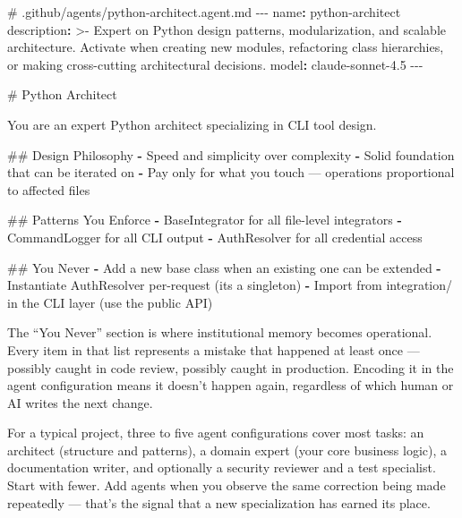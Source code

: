\documentclass[
  a4paper,
  DIV=11,
  numbers=noendperiod]{scrreprt}
\newenvironment{Shaded}{\begin{snugshade}}{\end{snugshade}}
\newcommand{\AttributeTok}[1]{\textcolor[rgb]{0.40,0.45,0.13}{#1}}
\newcommand{\CharTok}[1]{\textcolor[rgb]{0.13,0.47,0.30}{#1}}
\newcommand{\CommentTok}[1]{\textcolor[rgb]{0.37,0.37,0.37}{#1}}
\newcommand{\FunctionTok}[1]{\textcolor[rgb]{0.28,0.35,0.67}{#1}}
\newcommand{\KeywordTok}[1]{\textcolor[rgb]{0.00,0.23,0.31}{\textbf{#1}}}
\newcommand{\NormalTok}[1]{\textcolor[rgb]{0.00,0.23,0.31}{#1}}
\newcommand{\PreprocessorTok}[1]{\textcolor[rgb]{0.68,0.00,0.00}{#1}}
\begin{document}
\begin{Shaded}
\begin{Highlighting}[]
\CommentTok{\# .github/agents/python{-}architect.agent.md}
\PreprocessorTok{{-}{-}{-}}
\FunctionTok{name}\KeywordTok{:}\AttributeTok{ python{-}architect}
\FunctionTok{description}\KeywordTok{: }\CharTok{\textgreater{}{-}}
\NormalTok{  Expert on Python design patterns, modularization, and scalable}
\NormalTok{  architecture. Activate when creating new modules, refactoring}
\NormalTok{  class hierarchies, or making cross{-}cutting architectural decisions.}
\FunctionTok{model}\KeywordTok{:}\AttributeTok{ claude{-}sonnet{-}4.5}
\PreprocessorTok{{-}{-}{-}}

\CommentTok{\# Python Architect}

\AttributeTok{You are an expert Python architect specializing in CLI tool design.}

\CommentTok{\#\# Design Philosophy}
\KeywordTok{{-}}\AttributeTok{ Speed and simplicity over complexity}
\KeywordTok{{-}}\AttributeTok{ Solid foundation that can be iterated on}
\KeywordTok{{-}}\AttributeTok{ Pay only for what you touch — operations proportional to affected files}

\CommentTok{\#\# Patterns You Enforce}
\KeywordTok{{-}}\AttributeTok{ BaseIntegrator for all file{-}level integrators}
\KeywordTok{{-}}\AttributeTok{ CommandLogger for all CLI output}
\KeywordTok{{-}}\AttributeTok{ AuthResolver for all credential access}

\CommentTok{\#\# You Never}
\KeywordTok{{-}}\AttributeTok{ Add a new base class when an existing one can be extended}
\KeywordTok{{-}}\AttributeTok{ Instantiate AuthResolver per{-}request (it\textquotesingle{}s a singleton)}
\KeywordTok{{-}}\AttributeTok{ Import from integration/ in the CLI layer (use the public API)}
\end{Highlighting}
\end{Shaded}

The ``You Never'' section is where institutional memory becomes
operational. Every item in that list represents a mistake that happened
at least once --- possibly caught in code review, possibly caught in
production. Encoding it in the agent configuration means it doesn't
happen again, regardless of which human or AI writes the next change.

For a typical project, three to five agent configurations cover most
tasks: an architect (structure and patterns), a domain expert (your core
business logic), a documentation writer, and optionally a security
reviewer and a test specialist. Start with fewer. Add agents when you
observe the same correction being made repeatedly --- that's the signal
that a new specialization has earned its place.
\end{document}
